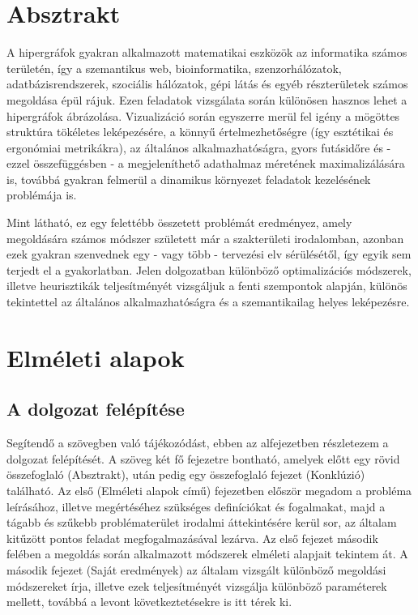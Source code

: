 

\chapter{Absztrakt}

A hipergráfok gyakran alkalmazott matematikai eszközök az informatika számos területén, így a szemantikus web, bioinformatika, szenzorhálózatok, adatbázisrendszerek, szociális hálózatok, gépi látás és egyéb részterületek számos megoldása épül rájuk.
Ezen feladatok vizsgálata során különösen hasznos lehet a hipergráfok ábrázolása. Vizualizáció során egyszerre merül fel igény a mögöttes struktúra tökéletes leképezésére, a könnyű értelmezhetőségre (így esztétikai és ergonómiai metrikákra), az általános alkalmazhatóságra, gyors futásidőre és - ezzel összefüggésben - a megjeleníthető adathalmaz méretének maximalizálására is, továbbá gyakran felmerül a dinamikus környezet feladatok kezelésének problémája is.


Mint látható, ez egy felettébb összetett problémát eredményez, amely megoldására számos módszer született már a szakterületi irodalomban, azonban ezek gyakran szenvednek egy - vagy több - tervezési elv sérülésétől, így egyik sem terjedt el a gyakorlatban.
Jelen dolgozatban különböző optimalizációs módszerek, illetve heurisztikák teljesítményét vizsgáljuk a fenti szempontok alapján, különös tekintettel az általános alkalmazhatóságra és a szemantikailag helyes leképezésre.

\chapter{Elméleti alapok}
\label{ch:intro}

\section{A dolgozat felépítése}

Segítendő a szövegben való tájékozódást, ebben az alfejezetben részletezem a dolgozat felépítését. A szöveg két fő fejezetre bontható, amelyek előtt egy rövid összefoglaló (Absztrakt), után pedig egy összefoglaló fejezet (Konklúzió) található. Az első (Elméleti alapok című) fejezetben először megadom a probléma leírásához, illetve megértéséhez szükséges definíciókat és fogalmakat, majd a tágabb és szűkebb problématerület irodalmi áttekintésére kerül sor, az általam kitűzött pontos feladat megfogalmazásával lezárva. Az első fejezet második felében a megoldás során alkalmazott módszerek elméleti alapjait tekintem át. A második fejezet (Saját eredmények) az általam vizsgált különböző megoldási módszereket írja, illetve ezek teljesítményét vizsgálja különböző paraméterek mellett, továbbá a levont következtetésekre is itt térek ki.


